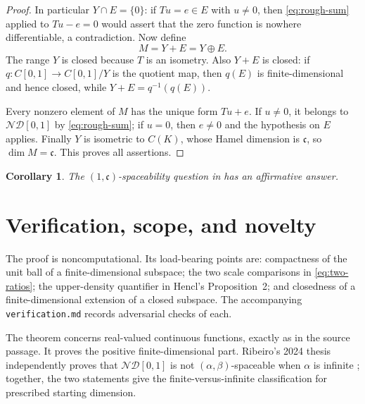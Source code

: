 \documentclass[11pt]{article}
\newtheorem{corollary}{Corollary}
\newcommand{\ND}{\mathcal{ND}[0,1]}
\newcommand{\cC}{\mathfrak c}
\begin{document}
\begin{proof}
In particular $Y\cap E=\{0\}$: if $Tu=e\in E$ with $u\ne0$, then
\eqref{eq:rough-sum} applied to $Tu-e=0$ would assert that the zero function
is nowhere differentiable, a contradiction.  Now define
\[
                              M=Y+E=Y\oplus E.
\]
The range $Y$ is closed because $T$ is an isometry.  Also $Y+E$ is closed:
if $q:C[0,1]\to C[0,1]/Y$ is the quotient map, then
$q(E)$ is finite-dimensional and hence closed, while
$Y+E=q^{-1}(q(E))$.

Every nonzero element of $M$ has the unique form $Tu+e$.  If $u\ne0$, it
belongs to $\ND$ by \eqref{eq:rough-sum}; if $u=0$, then $e\ne0$ and the
hypothesis on $E$ applies.  Finally $Y$ is isometric to $C(K)$, whose Hamel
dimension is $\cC$, so $\dim M=\cC$.  This proves all assertions.
\end{proof}

\begin{corollary}
The $(1,\cC)$-spaceability question in \cite{ABRR2025} has an affirmative
answer.
\end{corollary}

\section{Verification, scope, and novelty}

The proof is noncomputational.  Its load-bearing points are: compactness of
the unit ball of a finite-dimensional subspace; the two scale comparisons in
\eqref{eq:two-ratios}; the upper-density quantifier in Hencl's Proposition~2;
and closedness of a finite-dimensional extension of a closed subspace.  The
accompanying \texttt{verification.md} records adversarial checks of each.

The theorem concerns real-valued continuous functions, exactly as in the
source passage.  It proves the positive finite-dimensional part.  Ribeiro's
2024 thesis independently proves that $\ND$ is not
$(\alpha,\beta)$-spaceable when $\alpha$ is infinite
\cite[Corollary~2.2]{Ribeiro2024}; together, the two statements give the
finite-versus-infinite classification for prescribed starting dimension.
\end{document}
